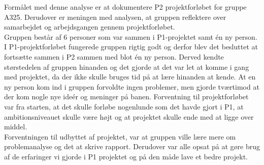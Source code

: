 Formålet med denne analyse er at dokumentere P2 projektforløbet for gruppe A325. Derudover er meningen med analysen, at gruppen reflektere over samarbejdet og arbejdsgangen gennem projektforløbet.
\\
Gruppen består af 6 personer som var sammen i P1-projektet samt én ny person. I P1-projektforløbet fungerede gruppen rigtig godt og derfor blev det besluttet at fortsætte sammen i P2 sammen med blot én ny person. Derved kendte størstedelen af gruppen hinanden og det gjorde at det var let at komme i gang med projektet, da  der ikke skulle bruges tid på at lære hinanden at kende. At en ny person kom ind i gruppen forvoldte ingen problemer, men gjorde tværtimod at der kom nogle nye ideér og meninger på banen. Forventning til projektforløbet var fra starten, at det skulle forløbe nogenlunde som det havde gjort i P1, at ambitionsniveauet skulle være højt og at projektet skulle ende med at ligge over middel. 
\\
Forventningen til udbyttet af projektet, var at gruppen ville lære mere om problemanalyse og det at skrive rapport. Derudover var alle opsat på at gøre brug af de erfaringer vi gjorde i P1 projektet og på den måde lave et bedre projekt. 
